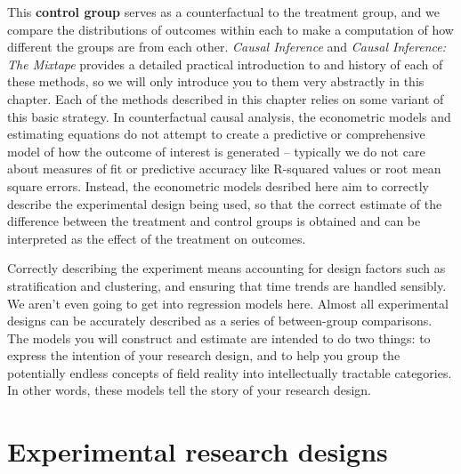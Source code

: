 This \textbf{control group} serves as a counterfactual to the treatment group,
and we compare the distributions of outcomes within each
to make a computation of how different the groups are from each other.
\textit{Causal Inference} and \textit{Causal Inference: The Mixtape}
provides a detailed practical introduction to and history of
each of these methods, so we will only introduce you to
them very abstractly in this chapter.
Each of the methods described in this chapter
relies on some variant of this basic strategy.
In counterfactual causal analysis,
the econometric models and estimating equations
do not attempt to create a predictive or comprehensive model
of how the outcome of interest is generated --
typically we do not care about measures of fit or predictive accuracy
like R-squared values or root mean square errors.
Instead, the econometric models desribed here aim to
correctly describe the experimental design being used,
so that the correct estimate of the difference
between the treatment and control groups is obtained
and can be interpreted as the effect of the treatment on outcomes.

Correctly describing the experiment means accounting for design factors
such as stratification and clustering, and
ensuring that time trends are handled sensibly.
We aren't even going to get into regression models here.
Almost all experimental designs can be accurately described
as a series of between-group comparisons.
The models you will construct and estimate are intended to do two things:
to express the intention of your research design,
and to help you group the potentially endless concepts of field reality
into intellectually tractable categories.
In other words, these models tell the story of your research design.


\section{Experimental research designs}

